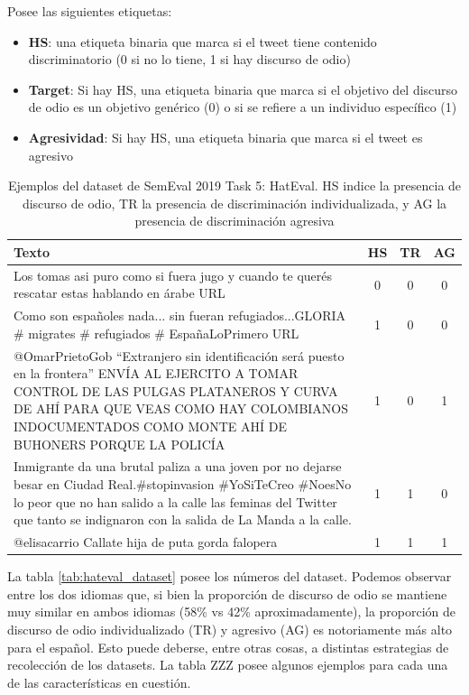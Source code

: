 Posee las siguientes etiquetas:

\begin{itemize}
    \item \textbf{HS}: una etiqueta binaria que marca si el tweet tiene contenido discriminatorio (0 si no lo tiene, 1 si hay discurso de odio)
    \item \textbf{Target}: Si hay HS, una etiqueta binaria que marca si el objetivo del discurso de odio es un objetivo genérico (0) o si se refiere a un individuo específico (1)
    \item \textbf{Agresividad}: Si hay HS, una etiqueta binaria que marca si el tweet es agresivo
\end{itemize}

\begin{table}
    \centering
    \footnotesize
    \begin{tabularx}{\textwidth}{X c c c}
        Texto & HS & TR & AG \\
        \hline
        Los tomas asi puro como si fuera jugo y cuando te querés rescatar estas hablando en árabe URL & 0 & 0 & 0 \\
        Como son españoles nada... sin fueran refugiados...GLORIA \# migrates \# refugiados \# EspañaLoPrimero URL & 1 & 0 & 0 \\
        @OmarPrietoGob ``Extranjero sin identificación será puesto en la frontera'' ENVÍA AL EJERCITO A TOMAR CONTROL DE LAS PULGAS PLATANEROS Y CURVA DE AHÍ PARA QUE VEAS COMO HAY COLOMBIANOS INDOCUMENTADOS COMO MONTE AHÍ DE BUHONERS PORQUE LA POLICÍA & 1 & 0 & 1 \\
        Inmigrante da una brutal paliza a una joven por no dejarse besar en Ciudad Real.\#stopinvasion \#YoSiTeCreo \#NoesNo lo peor que no han salido a la calle las feminas del Twitter que tanto se indignaron con la salida de La Manda a la calle. & 1 & 1 & 0 \\
        @elisacarrio Callate hija de puta gorda falopera & 1 & 1 & 1 \\
        \hline
    \end{tabularx}
    \label{tab:hateval_dataset_examples}
    \caption{Ejemplos del dataset de SemEval 2019 Task 5: HatEval. HS indice la presencia de discurso de odio, TR la presencia de discriminación individualizada, y AG la presencia de discriminación agresiva}

\end{table}


La tabla \ref{tab:hateval_dataset} posee los números del dataset. Podemos observar entre los dos idiomas que, si bien la proporción de discurso de odio se mantiene muy similar en ambos idiomas (58\% vs 42\% aproximadamente), la proporción de discurso de odio individualizado (TR) y agresivo (AG) es notoriamente más alto para el español. Esto puede deberse, entre otras cosas, a distintas estrategias de recolección de los datasets. La tabla ZZZ posee algunos ejemplos para cada una de las características en cuestión.

